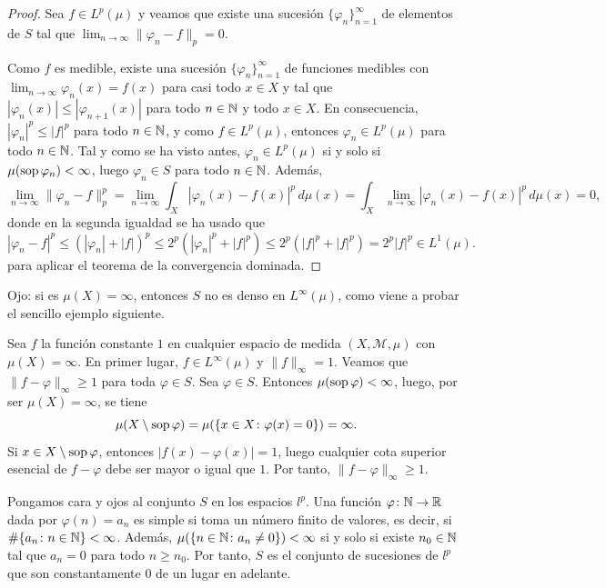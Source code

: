 \documentclass[a4paper, 11pt, oneside]{report}
\begin{document}
\begin{proof}
  Sea $f \in L^p(\mu)$ y veamos que existe una sucesión $\{\varphi_n\}_{n=1}^\infty$ de elementos de $S$ tal que $\lim_{n \to \infty} \|\varphi_n - f\|_p = 0$. 
  
  Como $f$ es medible, existe una sucesión $\{\varphi_n\}_{n=1}^\infty$ de funciones medibles con $\lim_{n \to \infty} \varphi_n(x)=f(x)$ para casi todo $x \in X$ y tal que $|\varphi_n(x)| \leq |\varphi_{n+1}(x)|$ para todo $n \in \mathbb N$ y todo $x \in X$. En consecuencia, $|\varphi_n|^p \leq |f|^p $ para todo $n \in \mathbb N$, y como $f \in L^p(\mu)$, entonces $\varphi_n \in L^p(\mu)$ para todo $n \in \mathbb N$. Tal y como se ha visto antes, $\varphi_n \in L^p(\mu)$ si y solo si $\mu(\textup{sop}\,\varphi_n)<\infty$, luego $\varphi_n \in S$ para todo $n \in \mathbb N$. Además,
  \[\lim_{n \to \infty} \|\varphi_n -f\|_p^p = \lim_{n \to \infty} \int_X |\varphi_n(x)-f(x)|^p \, d\mu(x) = \int_X \lim_{n \to \infty} |\varphi_n(x)-f(x)|^p \, d\mu(x) = 0,\]
  donde en la segunda igualdad se ha usado que
  \[|\varphi_n-f|^p \leq (|\varphi_n|+|f|)^p \leq 2^p(|\varphi_n|^p+|f|^p) \leq 2^p(|f|^p+|f|^p) = 2^p|f|^p \in L^1(\mu).\]
  para aplicar el teorema de la convergencia dominada.
\end{proof}

Ojo: si es $\mu(X)=\infty$, entonces $S$ no es denso en $L^\infty(\mu)$, como viene a probar el sencillo ejemplo siguiente.

\begin{example}
  Sea $f$ la función constante $1$ en cualquier espacio de medida $(X,\mathcal{M},\mu)$ con $\mu(X)=\infty$. En primer lugar, $f \in L^\infty(\mu)$ y $\|f\|_\infty = 1$. Veamos que $\|f-\varphi\|_\infty \geq 1$ para toda $\varphi \in S$. Sea $\varphi \in S$. Entonces $\mu(\textup{sop}\, \varphi) < \infty$, luego, por ser $\mu(X)=\infty$, se tiene
  \[\mu(X\setminus\textup{sop}\, \varphi) = \mu(\{x \in X \colon \varphi(x)=0\}) = \infty.\]
  Si $x \in X\setminus \textup{sop}\, \varphi$, entonces $|f(x)-\varphi(x)| = 1$, luego cualquier cota superior esencial de $f-\varphi$ debe ser mayor o igual que $1$. Por tanto, $\|f-\varphi\|_\infty \geq 1$.
\end{example}

\begin{example}
  Pongamos cara y ojos al conjunto $S$ en los espacios $l^p$. Una función $\varphi \colon \mathbb N \to \mathbb R$ dada por $\varphi(n)=a_n$ es simple si toma un número finito de valores, es decir, si $\#\{a_n \colon n \in \mathbb N\} < \infty$. Además, $\mu(\{n \in \mathbb N \colon a_n \neq 0\}) < \infty$ si y solo si existe $n_0 \in \mathbb N$ tal que $a_n = 0$ para todo $n \geq n_0$. Por tanto, $S$ es el conjunto de sucesiones de $l^p$ que son constantamente $0$ de un lugar en adelante.
\end{example}
\end{document}
